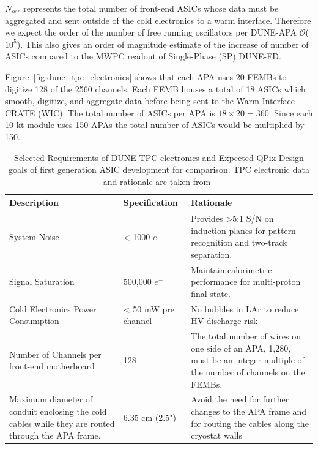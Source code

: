 $N_{osc}$ represents the total number of front-end ASICs whose data must be aggregated and sent outside of the cold electronics to a warm interface.
Therefore we expect the order of the number of free running oscillators per DUNE-APA $\mathcal{O}$($10^5$).
This also gives an order of magnitude estimate of the increase of number of ASICs compared to the MWPC readout of Single-Phase (SP) DUNE-FD.

Figure~\ref{fig:dune_tpc_electronics} shows that each APA uses 20 FEMBs to digitize 128 of the 2560 channels.
Each FEMB houses a total of 18 ASICs which smooth, digitize, and aggregate data before being sent to the Warm Interface CRATE (WIC).
The total number of ASICs per APA is $18\times 20 = 360$.
Since each 10 kt module uses 150 APAs the total number of ASICs would be multiplied by 150.

\begin{table}
\begin{center}
\begin{tabular}{|| p{50mm} | p{50mm} | p{50mm} ||}
 \hline
 Description & Specification & Rationale \\ [0.5ex]
 \hline\hline
  System Noise & < 1000 $e^{-}$ & Provides >5:1 S/N on induction planes for pattern recognition and two-track separation. \\
 \hline
  Signal Saturation & 500,000 $e^{-}$ & Maintain calorimetric performance for multi-proton final state. \\
 \hline
  Cold Electronics Power Consumption & < 50 mW pre channel & No bubbles in LAr to reduce HV discharge risk\\
 \hline
  Number of Channels per front-end motherboard & 128 &  The total number of wires on one side of an APA, 1,280, must be an integer multiple of the number of channels on the FEMBs. \\
 \hline
Maximum diameter of conduit enclosing the cold cables while they are routed through the APA frame. & 6.35 cm (2.5") & Avoid the need for further changes to the APA frame and for routing the cables along the cryostat walls \\
 \hline
\end{tabular}
\caption{Selected Requirements of DUNE TPC electronics and Expected QPix Design goals of first generation ASIC development for comparison. TPC electronic data and rationale are taken from~\citep{DUNE-FD_TDRv4:Abi_2020}}
\end{center}
\end{table}~\label{tab:dune_tpc_elec}

